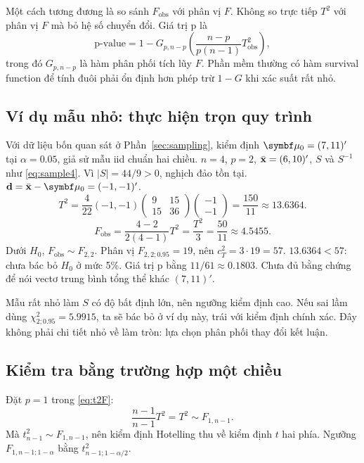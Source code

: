 Một cách tương đương là so sánh $F_{\mathrm{obs}}$ với phân vị $F$.
Không so trực tiếp $T^2$ với phân vị $F$ mà bỏ hệ số chuyển đổi.
Giá trị p là
\[
 \text{p-value}=1-G_{p,n-p}\!\left(\frac{n-p}{p(n-1)}T^2_{\mathrm{obs}}\right),
\]
trong đó $G_{p,n-p}$ là hàm phân phối tích lũy $F$.
Phần mềm thường có hàm survival function để tính đuôi phải ổn định hơn
phép trừ $1-G$ khi xác suất rất nhỏ.

\subsection{Ví dụ mẫu nhỏ: thực hiện trọn quy trình}
\begin{example}
Với dữ liệu bốn quan sát ở Phần~\ref{sec:sampling}, kiểm định
$\vmu_0=(7,11)'$ tại $\alpha=0.05$, giả sử mẫu iid chuẩn hai chiều.
$n=4$, $p=2$, $\bar{\mathbf x}=(6,10)'$, $S$ và $S^{-1}$ như
\eqref{eq:sample4}. Vì $|S|=44/9>0$, nghịch đảo tồn tại.
$\mathbf d=\xbar-\vmu_0=(-1,-1)'$.
\[
 T^2=\frac4{22}(-1,-1)
 \begin{pmatrix}9&15\\15&36\end{pmatrix}
 \begin{pmatrix}-1\\-1\end{pmatrix}
 =\frac{150}{11}\approx13.6364.
\]
\[
 F_{\mathrm{obs}}=\frac{4-2}{2(4-1)}T^2=
 \frac{T^2}{3}=\frac{50}{11}\approx4.5455.
\]
Dưới $H_0$, $F_{\mathrm{obs}}\sim F_{2,2}$.
Phân vị $F_{2,2;0.95}=19$, nên $c_T^2=3\cdot19=57$.
$13.6364<57$: chưa bác bỏ $H_0$ ở mức 5\%.
Giá trị p bằng $11/61\approx0.1803$.
Chưa đủ bằng chứng để nói vectơ trung bình tổng thể khác $(7,11)'$.
\end{example}

Mẫu rất nhỏ làm $S$ có độ bất định lớn, nên ngưỡng kiểm định cao.
Nếu sai lầm dùng $\chi^2_{2;0.95}=5.9915$, ta sẽ bác bỏ ở ví dụ này,
trái với kiểm định chính xác. Đây không phải chi tiết nhỏ về làm tròn:
lựa chọn phân phối thay đổi kết luận.

\subsection{Kiểm tra bằng trường hợp một chiều}
Đặt $p=1$ trong \eqref{eq:t2F}:
\[
 \frac{n-1}{n-1}T^2=T^2\sim F_{1,n-1}.
\]
Mà $t_{n-1}^2\sim F_{1,n-1}$, nên kiểm định Hotelling thu về kiểm định
$t$ hai phía. Ngưỡng $F_{1,n-1;1-\alpha}$ bằng
$t_{n-1;1-\alpha/2}^2$.

